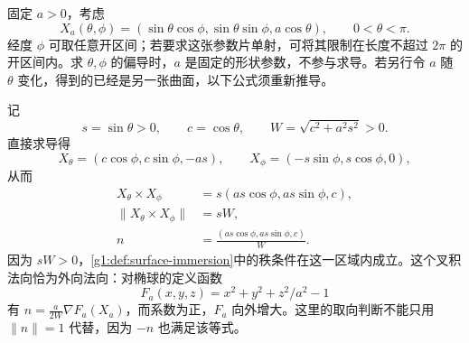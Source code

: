 \begin{example}\label{g1:exm:ellipsoid-exact-certificate}
	固定 \(a>0\)，考虑
	\[
		X_a(\theta,\phi)
		=(\sin\theta\cos\phi,\sin\theta\sin\phi,a\cos\theta),
		\qquad 0<\theta<\pi.
	\]
	经度 \(\phi\) 可取任意开区间；若要求这张参数片单射，可将其限制在长度不超过 \(2\pi\) 的开区间内。求 \(\theta,\phi\) 的偏导时，\(a\) 是固定的形状参数，不参与求导。若另行令 \(a\) 随 \(\theta\) 变化，得到的已经是另一张曲面，以下公式须重新推导。

	记
	\[
		s=\sin\theta>0,\qquad c=\cos\theta,\qquad
		W=\sqrt{c^2+a^2s^2}>0.
	\]
	直接求导得
	\[
		X_\theta=(c\cos\phi,c\sin\phi,-as),\qquad
		X_\phi=(-s\sin\phi,s\cos\phi,0),
	\]
	从而
	\begin{equation}\label{g1:eq:ellipsoid-area-normal}
		\begin{aligned}
			X_\theta\times X_\phi&=s(as\cos\phi,as\sin\phi,c),\\
			\lVert X_\theta\times X_\phi\rVert&=sW,\\
			n&=\frac{(as\cos\phi,as\sin\phi,c)}{W}.
		\end{aligned}
	\end{equation}
	因为 \(sW>0\)，\cref{g1:def:surface-immersion}中的秩条件在这一区域内成立。这个叉积法向恰为外向法向：对椭球的定义函数
	\[
		F_a(x,y,z)=x^2+y^2+z^2/a^2-1
	\]
	有 \(n=\frac{a}{2W}\nabla F_a(X_a)\)，而系数为正，\(F_a\) 向外增大。这里的取向判断不能只用 \(\lVert n\rVert=1\) 代替，因为 \(-n\) 也满足该等式。


\end{example}
